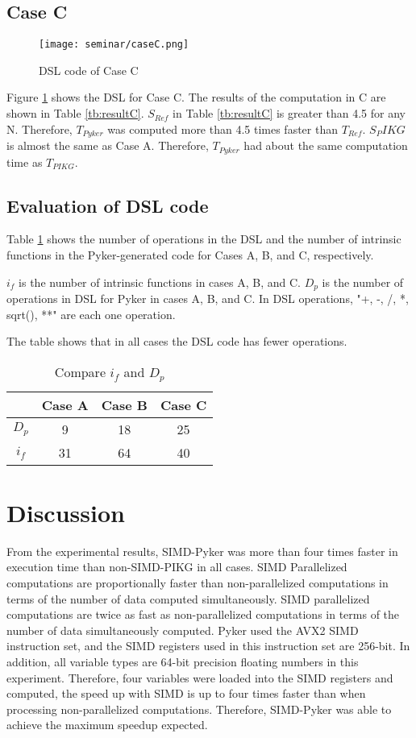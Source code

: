 \documentclass[ams]{article}
\begin{document}
\subsection{Case C}
\begin{figure}[htbp]
\centering
\texttt{[image: seminar/caseC.png]}
\caption{DSL code of Case C}
\label{fig:CaseC}
\end{figure}
Figure \ref{fig:CaseC} shows the DSL for Case C.
The results of the computation in C are shown in Table \ref{tb:resultC}. $S_{Ref}$ in Table \ref{tb:resultC} is greater than 4.5 for any N. Therefore, $T_{Pyker}$ was computed more than 4.5 times faster than $T_{Ref}$. $S_PIKG$ is almost the same as Case A. Therefore, $T_{Pyker}$ had about the same computation time as $T_{PIKG}$.



 \subsection{Evaluation of DSL code}
Table \ref{tb:dslev} shows the number of operations in the DSL and the number of intrinsic functions in the Pyker-generated code for Cases A, B, and C, respectively.

$i_f$ is the number of intrinsic functions in cases A, B, and C.
$D_p$ is the number of operations in DSL for Pyker in cases A, B, and C.
In DSL operations, "+, -, /, *, sqrt(), **" are each one operation.

The table shows that in all cases the DSL code has fewer operations.

 
		\begin{table}[htb]
                    \centering
				\caption{Compare $i_f$ and $D_p$}
				\label{tb:dslev}
				\begin{tabular}{|c||c|c|c|} \hline
 & Case A & Case B & Case C  \\ \hline\hline
$D_p$ &9 &18& 25\\ \hline
$i_f$&31&64& 40\\ \hline
				\end{tabular}
			\end{table}

\section{Discussion}

From the experimental results, SIMD-Pyker was more than four times faster in execution time than non-SIMD-PIKG in all cases. SIMD Parallelized computations are proportionally faster than non-parallelized computations in terms of the number of data computed simultaneously. SIMD parallelized computations are twice as fast as non-parallelized computations in terms of the number of data simultaneously computed. Pyker used the AVX2 SIMD instruction set, and the SIMD registers used in this instruction set are 256-bit. In addition, all variable types are 64-bit precision floating numbers in this experiment. Therefore, four variables were loaded into the SIMD registers and computed, the speed up with SIMD is up to four times faster than when processing non-parallelized computations. Therefore, SIMD-Pyker was able to achieve the maximum speedup expected.
\end{document}

